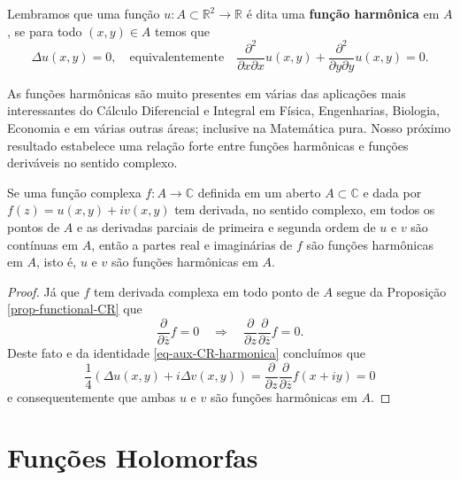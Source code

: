 Lembramos que uma função $u:A\subset\mathbb{R}^2\to\mathbb{R}$ é dita uma {\bf função harmônica} em $A$,
se para todo $(x,y)\in A$ temos que 
\[
\Delta u(x,y) = 0,\quad \text{equivalentemente}\quad  \frac{\partial^2}{\partial x\partial x}u(x,y) + \frac{\partial^2}{\partial y\partial y}u(x,y)=0. 
\]

As funções harmônicas são muito presentes em várias das aplicações mais interessantes do Cálculo Diferencial e Integral
em Física, Engenharias, Biologia, Economia e em várias outras áreas; inclusive na Matemática pura.
Nosso próximo resultado estabelece uma relação forte entre funções harmônicas e funções deriváveis no sentido complexo.
\begin{lema}\label{lema-holomorfas-harmonicas}
Se uma função complexa $f:A\to\mathbb{C}$ definida em um aberto $A\subset\mathbb{C}$ e dada por
$f(z)=u(x,y)+iv(x,y)$  tem derivada, no sentido complexo, em todos os pontos de $A$ 
e as derivadas parciais de primeira e segunda ordem de $u$ e $v$ são contínuas em $A$, 
então a partes real e imaginárias de $f$ são funções harmônicas em $A$, isto é,  $u$ e $v$ são funções harmônicas em $A$.
\end{lema}

\begin{proof}
Já que $f$ tem derivada complexa em todo ponto de $A$ segue da  Proposição \ref{prop-functional-CR} 	
que 
\[
\frac{\partial}{\partial \overline{z}}f=0
\quad \Longrightarrow\quad 
\frac{\partial }{\partial z}\frac{\partial}{\partial \overline{z}}f=0.
\]
Deste fato e da identidade \eqref{eq-aux-CR-harmonica} concluímos que 
\[
\frac{1}{4}(\Delta u(x,y)+ i \Delta v(x,y))
=
\frac{\partial}{\partial z} \frac{\partial}{\partial \overline{z}} f(x+iy)
=
0
\]
e consequentemente que ambas $u$ e $v$ são funções harmônicas em $A$.
\end{proof}


\section{Funções Holomorfas}

